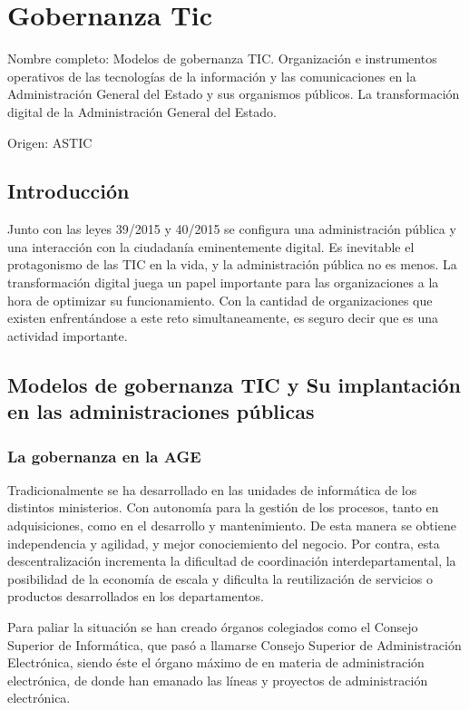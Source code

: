 \setcounter{section}{29}
\section{Gobernanza Tic}

Nombre completo: Modelos de gobernanza TIC. Organización e instrumentos operativos de las tecnologías de la información y las comunicaciones en la Administración General del Estado y sus organismos públicos. La transformación digital de la Administración General del Estado.

Origen: ASTIC
\noindent{}

\localtableofcontents

\subsection{Introducción}
Junto con las leyes 39/2015 y 40/2015 se configura una administración pública y una interacción con la ciudadanía eminentemente digital. Es inevitable el protagonismo de las TIC en la vida, y la administración pública no es menos. La transformación digital juega un papel importante para las organizaciones a la hora de optimizar su funcionamiento. Con la cantidad de organizaciones que existen enfrentándose a este reto simultaneamente, es seguro decir que es una actividad importante.

\subsection{Modelos de gobernanza TIC y Su implantación en las administraciones públicas}
    \subsubsection{La gobernanza en la AGE}
        Tradicionalmente se ha desarrollado en las unidades de informática de los distintos ministerios. Con autonomía para la gestión de los procesos, tanto en adquisiciones, como en el desarrollo y mantenimiento. De esta manera se obtiene independencia y agilidad, y mejor conociemiento del negocio. Por contra, esta descentralización incrementa la dificultad de coordinación interdepartamental,  la posibilidad de la economía de escala y dificulta la reutilización de servicios o productos desarrollados en los departamentos.

        Para paliar la situación se han creado órganos colegiados como el Consejo Superior de Informática, que pasó a llamarse Consejo Superior de Administración Electrónica, siendo éste el órgano máximo de en materia de administración electrónica, de donde han emanado las líneas y proyectos de administración electrónica.

